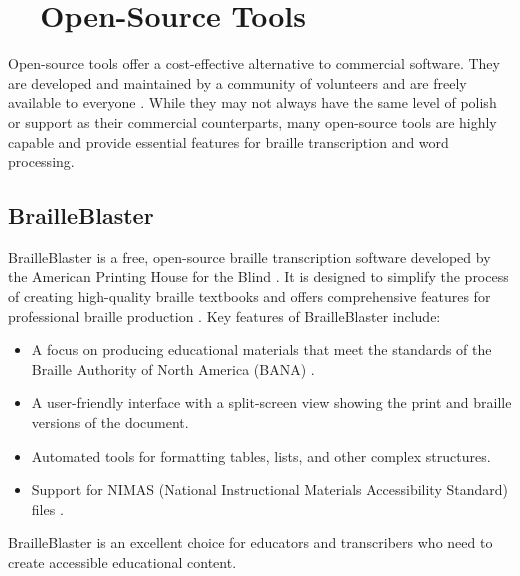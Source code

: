 \section{~~Open-Source Tools}\label{ch12:sec:open-source-tools}
Open-source tools offer a cost-effective alternative to commercial software. They are developed and maintained by a community of volunteers and are freely available to everyone \supercite{Stallman2002}. While they may not always have the same level of polish or support as their commercial counterparts, many open-source tools are highly capable and provide essential features for braille transcription and word processing.

\subsection{BrailleBlaster}\label{ch12:ssec:brailleblaster}
BrailleBlaster is a free, open-source braille transcription software developed by the American Printing House for the Blind \supercite{BrailleBlaster, APHBrailleBlaster, BrailleBlasterOrg}. It is designed to simplify the process of creating high-quality braille textbooks and offers comprehensive features for professional braille production \supercite{APHBrailleBlasterFeatures}. Key features of BrailleBlaster include:
\begin{itemize}
	\item A focus on producing educational materials that meet the standards of the Braille Authority of North America (BANA) \supercite{BANA}.
	\item A user-friendly interface with a split-screen view showing the print and braille versions of the document.
	\item Automated tools for formatting tables, lists, and other complex structures.
	\item Support for NIMAS (National Instructional Materials Accessibility Standard) files \supercite{NIMAC2025}.
\end{itemize}
BrailleBlaster is an excellent choice for educators and transcribers who need to create accessible educational content.

